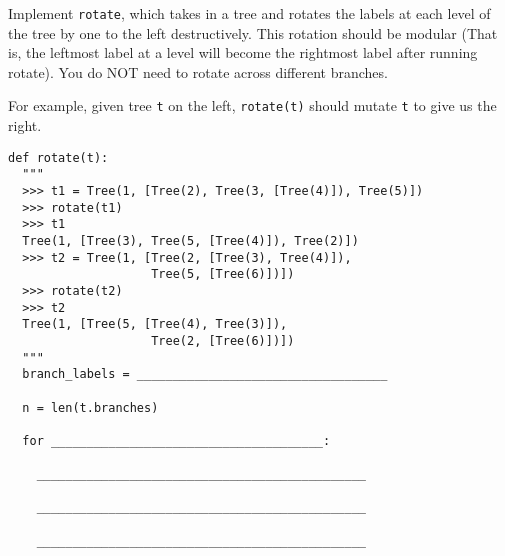 \begin{blocksection}
\question Implement \texttt{rotate}, which takes in a tree and rotates the labels at each level of the tree by one to the left destructively. This rotation should be modular (That is, the leftmost label at a level will become the rightmost label after running rotate). You do NOT need to rotate across different branches.

For example, given tree \texttt{t} on the left, \texttt{rotate(t)} should mutate \texttt{t} to give us the right.

\begin{minipage}[t]{0.4\textwidth}
\end{minipage}
\begin{minipage}[t]{0.4\textwidth}
\end{minipage}

\begin{lstlisting}
def rotate(t):
  """
  >>> t1 = Tree(1, [Tree(2), Tree(3, [Tree(4)]), Tree(5)])
  >>> rotate(t1)
  >>> t1
  Tree(1, [Tree(3), Tree(5, [Tree(4)]), Tree(2)])
  >>> t2 = Tree(1, [Tree(2, [Tree(3), Tree(4)]), 
                    Tree(5, [Tree(6)])])
  >>> rotate(t2)
  >>> t2
  Tree(1, [Tree(5, [Tree(4), Tree(3)]), 
                    Tree(2, [Tree(6)])])
  """
  branch_labels = ___________________________________

  n = len(t.branches)

  for ______________________________________:

    ______________________________________________

    ______________________________________________
    
    ______________________________________________ 
\end{lstlisting}
\end{blocksection}

